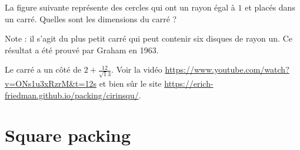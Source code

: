 \begin{exo}
La figure suivante représente des cercles qui ont  un rayon égal à $1$ et placés dans un carré.
Quelles sont les dimensions du carré ?
\begin{center}


\end{center}
Note : il s'agit du plus petit carré qui peut contenir six disques de rayon un. Ce résultat a été prouvé par Graham en 1963.
\begin{hint}

\end{hint}
\begin{sol}
Le carré a un côté de $2+\frac{12}{\sqrt 13}$. Voir la vidéo \url{https://www.youtube.com/watch?v=ONs1u3xRzrM&t=12s} et bien sûr le site \url{https://erich-friedman.github.io/packing/cirinsqu/}.
\end{sol}
\end{exo}



\section{Square packing}







